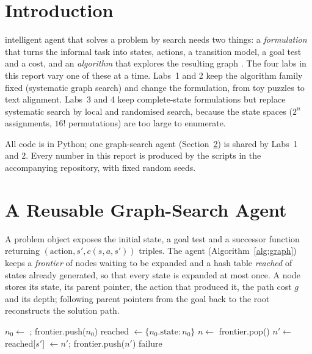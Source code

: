 \documentclass[journal]{IEEEtran}
\begin{document}
\section{Introduction}
 intelligent agent that solves a problem by search needs two things: a
\emph{formulation} that turns the informal task into states, actions, a transition model, a
goal test and a cost, and an \emph{algorithm} that explores the resulting graph
\cite{aima4}. The four labs in this report vary one of these at a time. Labs~1 and 2 keep the
algorithm family fixed (systematic graph search) and change the formulation, from toy puzzles
to text alignment. Labs~3 and 4 keep complete-state formulations but replace systematic search
by local and randomised search, because the state spaces ($2^n$ assignments, $16!$
permutations) are too large to enumerate.

All code is in Python; one graph-search agent (Section~\ref{sec:agent}) is shared by Labs~1
and 2. Every number in this report is produced by the scripts in the accompanying
repository, with fixed random seeds.

\section{A Reusable Graph-Search Agent}\label{sec:agent}
A problem object exposes the initial state, a goal test and a successor function returning
$(\text{action}, s', c(s,a,s'))$ triples. The agent (Algorithm~\ref{alg:graph}) keeps a
\emph{frontier} of nodes waiting to be expanded and a hash table \emph{reached} of states
already generated, so that every state is expanded at most once. A node stores its state,
its parent pointer, the action that produced it, the path cost $g$ and its depth; following
parent pointers from the goal back to the root reconstructs the solution path.

\begin{algorithm}[t]
\caption{Graph search with a pluggable frontier}\label{alg:graph}
\begin{algorithmic}[1]
  \State $n_0 \gets$ ; frontier.push($n_0$)
  \State reached $\gets \{n_0.\text{state}: n_0\}$ 
    \State $n \gets$ frontier.pop()
     \Return {} \EndIf
      \State $n' \gets$ 
        \State reached[$s'$] $\gets n'$; frontier.push($n'$)
      \EndIf
    \EndFor
  \EndWhile
  \State \Return failure
\EndFunction
\end{algorithmic}
\end{algorithm}
\end{document}
